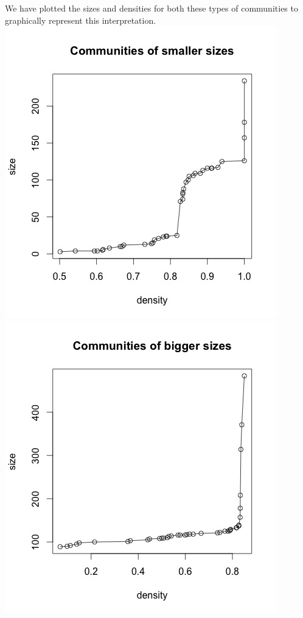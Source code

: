 \documentclass{article}
\begin{document}
We have plotted the sizes and densities for both these types of communities to graphically represent this interpretation.\\
\includegraphics[scale=0.4]{Q6a} \\
\includegraphics[scale=0.4]{Q6b} \\
\end{document}
